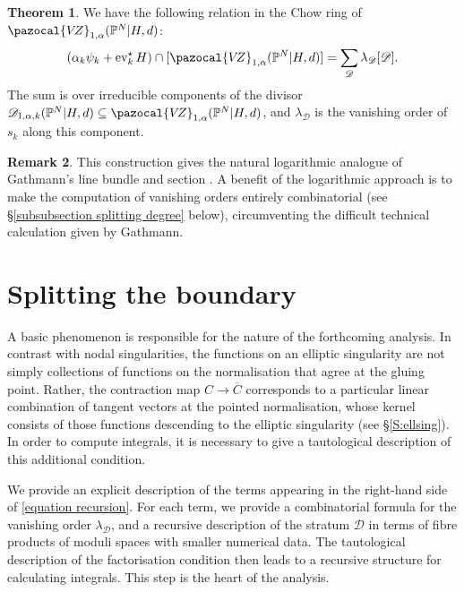 \documentclass[11pt]{amsart}
\newcommand{\PP}{\mathbb P}
\newcommand{\VZ}{\pazocal{V\!Z}}
\newcommand{\st}{\star}
\renewcommand{\to}{\rightarrow}
\newcommand{\ev}{\operatorname{ev}}
\newcommand{\Dcal}{\mathcal{D}}
\theoremstyle{definition}
\newtheorem{thm}{Theorem}[section]
\theoremstyle{definition}
\newtheorem{remark}[thm]{Remark}
\begin{document}
\begin{thm} \label{theorem recursion} We have the following relation in the Chow ring of $\VZ_{1,\alpha}(\PP^N|H,d)$:
\begin{equation}\label{equation recursion} (\alpha_k \psi_k + \ev_k^\st H) \cap [\VZ_{1,\alpha}(\PP^N|H,d)] = \sum_{\Dcal} \lambda_\Dcal [ \Dcal ].\end{equation}
The sum is over irreducible components of the divisor $\Dcal_{1,\alpha,k}(\PP^N|H,d) \subseteq \VZ_{1,\alpha}(\PP^N|H,d)$, and $\lambda_\Dcal$ is the vanishing order of $s_k$ along this component. \end{thm}

\begin{remark} This construction gives the natural logarithmic analogue of Gathmann's line bundle and section \cite[Construction 2.1]{Ga}. A benefit of the logarithmic approach is to make the computation of vanishing orders entirely combinatorial (see \S \ref{subsubsection splitting degree} below), circumventing the difficult technical calculation given by Gathmann. \end{remark}

\section{Splitting the boundary}\label{section reduced splitting}

\noindent A basic phenomenon is responsible for the nature of the forthcoming analysis. In contrast with nodal singularities, the functions on an elliptic singularity are not simply collections of functions on the normalisation that agree at the gluing point. Rather, the contraction map $C\to\overline C$ corresponds to a particular linear combination of tangent vectors at the pointed normalisation, whose kernel consists of those functions descending to the elliptic singularity (see \S \ref{S:ellsing}). In order to compute integrals, it is necessary to give a tautological description of this additional condition. %

We provide an explicit description of the terms appearing in the right-hand side of \eqref{equation recursion}.  For each term, we provide a combinatorial formula for the vanishing order $\lambda_\Dcal$, and a recursive description of the stratum $\Dcal$ 
in terms of fibre products of moduli spaces with smaller numerical data. The tautological description of the factorisation condition then leads to a recursive structure for calculating integrals. This step is the heart of the analysis. 
\end{document}
